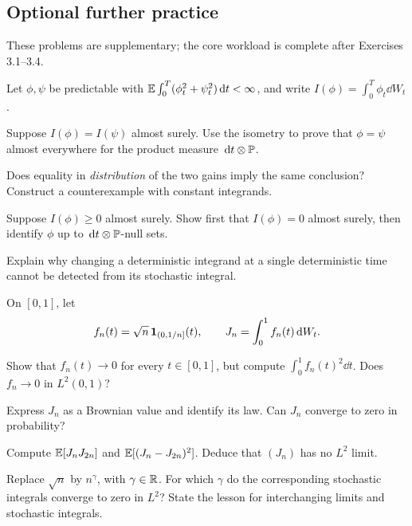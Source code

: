 \ifIncludeFurther
{}
\subsection*{Optional further practice}
\noindent These problems are supplementary; the core workload is complete after Exercises 3.1--3.4.
\setcounter{exercise}{4}
\begin{exercise}
Let \(\phi,\psi\) be predictable with
\(\mathbb E\int_0^T(\phi_t^2+\psi_t^2)\,\mathrm d t<\infty\), and write
\(I(\phi)=\int_0^T\phi_t\dd W_t\).
\begin{exparts}
  \item Suppose \(I(\phi)=I(\psi)\) almost surely. Use the isometry to
  prove that \(\phi=\psi\) almost everywhere for the product measure
  \(\,\mathrm d t\otimes\mathbb P\).
  \item Does equality in \emph{distribution} of the two gains imply the
  same conclusion? Construct a counterexample with constant integrands.
  \item Suppose \(I(\phi)\geq0\) almost surely. Show first that
  \(I(\phi)=0\) almost surely, then identify \(\phi\) up to
  \(\,\mathrm d t\otimes\mathbb P\)-null sets.
  \item Explain why changing a deterministic integrand at a single
  deterministic time cannot be detected from its stochastic integral.
\end{exparts}
\end{exercise}

\begin{exercise}
On \([0,1]\), let
\[
f_n(t)=\sqrt n\,\mathbf{1}_{(0,1/n]}(t),
\qquad
J_n=\int_0^1 f_n(t)\,\mathrm d W_t.
\]
\begin{exparts}
  \item Show that \(f_n(t)\to0\) for every \(t\in[0,1]\), but compute
  \(\int_0^1f_n(t)^2\dd t\). Does \(f_n\to0\) in \(L^2(0,1)\)?
  \item Express \(J_n\) as a Brownian value and identify its law.
  Can \(J_n\) converge to zero in probability?
  \item Compute \(\mathbb E[J_nJ_{2n}]\) and
  \(\mathbb E[(J_n-J_{2n})^2]\). Deduce that \((J_n)\) has no \(L^2\) limit.
  \item Replace \(\sqrt n\) by \(n^\gamma\), with \(\gamma\in\mathbb{R}\).
  For which \(\gamma\) do the corresponding stochastic integrals converge
  to zero in \(L^2\)? State the lesson for interchanging limits and
  stochastic integrals.
\end{exparts}
\end{exercise}

